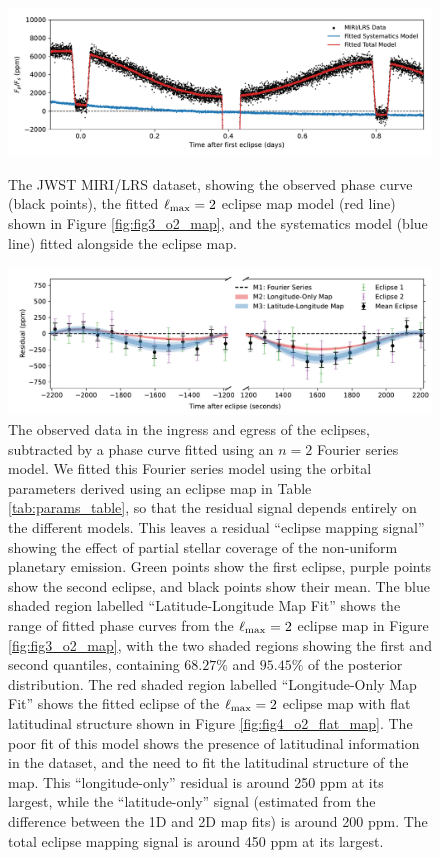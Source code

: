 \documentclass[twocolumn]{aastex631}
\begin{document}
\begin{figure}
    \centering
    \includegraphics[width=\textwidth]{fig1_lightcurve.pdf}
    \caption{The JWST MIRI/LRS dataset, showing the observed phase curve (black points), the fitted $\ell_{\rm max}=2$ eclipse map model (red line) shown in Figure \ref{fig:fig3_o2_map}, and the systematics model (blue line) fitted alongside the eclipse map.}
    \label{fig:fig1_lightcurve}

    \centering
    \includegraphics[width=\textwidth]{fig2_residual.pdf}
    \caption{The observed data in the ingress and egress of the eclipses, subtracted by a phase curve fitted using an $n=2$ Fourier series model. We fitted this Fourier series model using the orbital parameters derived using an eclipse map in Table \ref{tab:params_table}, so that the residual signal depends entirely on the different models. This leaves a residual ``eclipse mapping signal'' showing the effect of partial stellar coverage of the non-uniform planetary emission. Green points show the first eclipse, purple points show the second eclipse, and black points show their mean. The blue shaded region labelled ``Latitude-Longitude Map Fit'' shows the range of fitted phase curves from the $\ell_{\rm max}=2$ eclipse map in Figure \ref{fig:fig3_o2_map}, with the two shaded regions showing the first and second quantiles, containing $68.27\%$ and $95.45\%$ of the posterior distribution. The red shaded region labelled ``Longitude-Only Map Fit'' shows the fitted eclipse of the $\ell_{\rm max}=2$ eclipse map with flat latitudinal structure shown in Figure \ref{fig:fig4_o2_flat_map}. The poor fit of this model shows the presence of latitudinal information in the dataset, and the need to fit the latitudinal structure of the map. This ``longitude-only'' residual is around 250 ppm at its largest, while the ``latitude-only'' signal (estimated from the difference between the 1D and 2D map fits) is around 200 ppm. The total  eclipse mapping signal is around 450 ppm at its largest.}
    \label{fig:fig2_residual}
\end{figure}
\end{document}
